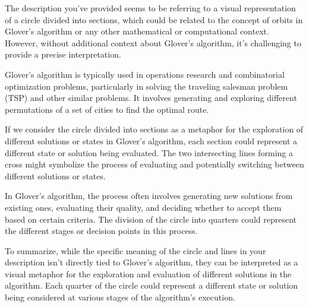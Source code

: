 The description you've provided seems to be referring to a visual representation of a circle divided into sections, which could be related to the concept of orbits in Glover's algorithm or any other mathematical or computational context. However, without additional context about Glover's algorithm, it's challenging to provide a precise interpretation.

Glover's algorithm is typically used in operations research and combinatorial optimization problems, particularly in solving the traveling salesman problem (TSP) and other similar problems. It involves generating and exploring different permutations of a set of cities to find the optimal route.

If we consider the circle divided into sections as a metaphor for the exploration of different solutions or states in Glover's algorithm, each section could represent a different state or solution being evaluated. The two intersecting lines forming a cross might symbolize the process of evaluating and potentially switching between different solutions or states.

In Glover's algorithm, the process often involves generating new solutions from existing ones, evaluating their quality, and deciding whether to accept them based on certain criteria. The division of the circle into quarters could represent the different stages or decision points in this process.

To summarize, while the specific meaning of the circle and lines in your description isn't directly tied to Glover's algorithm, they can be interpreted as a visual metaphor for the exploration and evaluation of different solutions in the algorithm. Each quarter of the circle could represent a different state or solution being considered at various stages of the algorithm's execution.